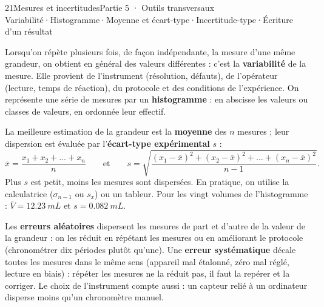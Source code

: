 \begin{ouverture}[mesure]{21}{Mesures et incertitudes}{Partie 5 · Outils transversaux}
{Variabilité\enspace·\enspace Histogramme\enspace·\enspace Moyenne et écart-type\enspace·\enspace Incertitude-type\enspace·\enspace Écriture d'un résultat}
\end{ouverture}
\essentiel
{}
\begin{definition}
Lorsqu'on répète plusieurs fois, de façon indépendante, la mesure d'une même grandeur, on obtient en général des valeurs
différentes : c'est la \textbf{variabilité} de la mesure. Elle provient de l'instrument (résolution, défauts), de l'opérateur (lecture,
temps de réaction), du protocole et des conditions de l'expérience. On représente une série de mesures par un \textbf{histogramme} :
en abscisse les valeurs ou classes de valeurs, en ordonnée leur effectif.
\end{definition}
\par{}
\begin{propriete}
La meilleure estimation de la grandeur est la \textbf{moyenne} des $n$ mesures ; leur dispersion est évaluée par l'\textbf{écart-type
expérimental} $s$ :
\[\overline{x}=\frac{x_1+x_2+\dots+x_n}{n}\qquad\text{et}\qquad s=\sqrt{\frac{(x_1-\overline{x})^2+(x_2-\overline{x})^2+\dots+(x_n-\overline{x})^2}{n-1}}.\]
Plus $s$ est petit, moins les mesures sont dispersées. En pratique, on utilise la calculatrice ($\sigma_{n-1}$ ou $s_x$) ou un tableur. Pour
les vingt volumes de l'histogramme : $\overline{V}=\qty{12,23}{mL}$ et $s=\qty{0,082}{mL}$.
\end{propriete}
\begin{propriete}
Les \textbf{erreurs aléatoires} dispersent les mesures de part et d'autre de la valeur de la grandeur : on les réduit en répétant
les mesures ou en améliorant le protocole (chronométrer dix périodes plutôt qu'une). Une \textbf{erreur systématique} décale toutes
les mesures dans le même sens (appareil mal étalonné, zéro mal réglé, lecture en biais) : répéter les mesures ne la réduit pas, il faut
la repérer et la corriger. Le choix de l'instrument compte aussi : un capteur relié à un ordinateur disperse moins qu'un chronomètre manuel.
\end{propriete}
